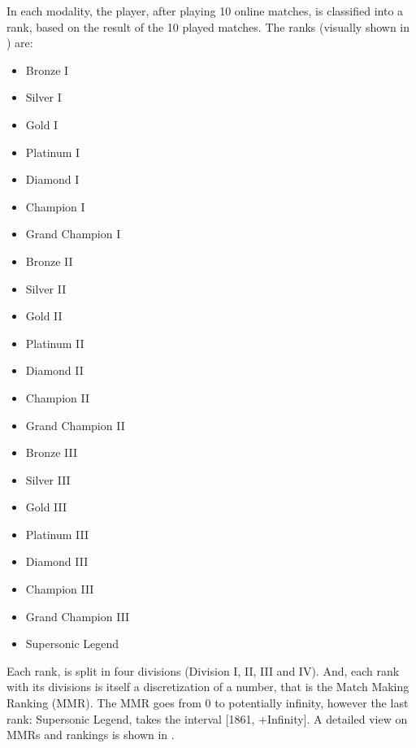 In each modality, the player, after playing 10 online matches, is classified into a rank, based on the result of the 10 played matches. The ranks (visually shown in ) are: 


\begin{multicols}{3}
    \begin{itemize}
        \item Bronze I
        \item Silver I
        \item Gold I
        \item Platinum I      
        \item Diamond I        
        \item Champion I         
        \item Grand Champion I    
        \item Bronze II
        \item Silver II
        \item Gold II       
        \item Platinum II     
        \item Diamond  II         
        \item Champion II         
        \item Grand Champion II
        \item Bronze III
        \item Silver III
        \item Gold III    
        \item Platinum III     
        \item Diamond  III        
        \item Champion III         
        \item Grand Champion III
    \end{itemize}
\end{multicols}

\begin{itemize}
    \item Supersonic Legend
\end{itemize}

Each rank, is split in four divisions (Division I, II, III and IV). And, each rank with its divisions is itself a discretization of a number, that is the Match Making Ranking (MMR). 
The MMR goes from 0 to potentially infinity, however the last rank: Supersonic Legend, takes the interval [1861, +Infinity]. A detailed view on MMRs and rankings is shown in .

